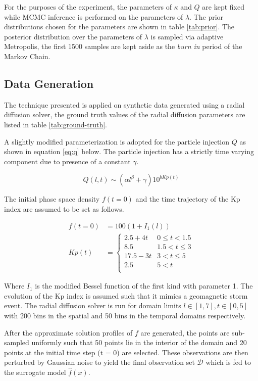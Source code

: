 \documentclass{article}
\begin{document}
For the purposes of the experiment, the parameters of $\kappa$ and $Q$ are kept fixed while MCMC inference 
is performed on the parameters of $\lambda$. The prior distributions chosen for the parameters 
are shown in table \ref{tab:prior}. The posterior distribution over the parameters of $\lambda$ is 
sampled via adaptive Metropolis, the first 1500 samples are kept aside as the \emph{burn in} period
of the Markov Chain.

\subsection*{Data Generation}

The technique presented is applied on synthetic data generated using a radial diffusion solver, 
the ground truth values of the radial diffusion parameters are listed in table \ref{tab:ground-truth}.

A slightly modified parameterization is adopted for the particle injection $Q$ as shown in equation \ref{eq:q}
below. The particle injection has a strictly time varying component due to presence of a constant $\gamma$.

\begin{equation}\label{eq:q}
Q(l,t)  \sim (\alpha l^{\beta} + \gamma) 10^{b Kp(t)}
\end{equation}

The initial phase space density $f(t = 0)$ and the time trajectory 
of the Kp index are assumed to be set as follows.

\begin{align}
f(t = 0) &= 100(1 + I_1(l)) \\
Kp(t) &= \left\{\begin{matrix}
2.5 + 4t & 0 \leq t < 1.5\\ 
8.5 & 1.5 < t \leq 3\\ 
17.5-3t & 3 <  t \leq 5 \\ 
2.5 & 5 < t\\ 
\end{matrix}\right.
\end{align}

Where $I_1$ is the modified Bessel function of the first kind with parameter 1. 
The evolution of the Kp index \citep{BartelsKp} is assumed such that it mimics a geomagnetic storm event. 
The radial diffusion solver is run for domain limits $l \in [1, 7], t \in [0, 5]$ with
200 bins in the spatial and 50 bins in the temporal domains respectively.

After the approximate solution profiles of $f$ are generated, the points are sub-sampled
uniformly such that 50 points lie in the interior of the domain and 20 points at the initial time step (t = 0)
are selected. These observations are then perturbed by Gaussian noise to yield
the final observation set $\mathcal{D}$ which is fed to the surrogate model $\hat{f}(x)$.
\end{document}

